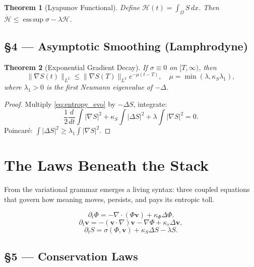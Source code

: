 \documentclass[11pt]{article}
\newtheorem{theorem}{Theorem}[section]
\theoremstyle{definition}
\theoremstyle{remark}
\newcommand{\vect}[1]{\bm{#1}}
\newcommand{\norm}[1]{\lVert #1\rVert}
\DeclareMathOperator{\esssup}{ess\,sup}
\begin{document}
\begin{theorem}[Lyapunov Functional]
Define $\mathcal{H}(t) = \int_\Omega S\,dx$. Then $\dot{\mathcal{H}} \le \esssup \sigma - \lambda \mathcal{H}$.
\end{theorem}

\subsection*{§4 — Asymptotic Smoothing (Lamphrodyne)}

\begin{theorem}[Exponential Gradient Decay]
If $\sigma \equiv 0$ on $[T,\infty)$, then
\[
\norm{\nabla S(t)}_{L^2} \le \norm{\nabla S(T)}_{L^2} e^{-\mu (t-T)}, \quad \mu = \min(\lambda, \kappa_S \lambda_1),
\]
where $\lambda_1 > 0$ is the first Neumann eigenvalue of $-\Delta$.
\end{theorem}

\begin{proof}
Multiply \eqref{eq:entropy_evo} by $-\Delta S$, integrate:
\[
\frac{1}{2} \frac{d}{dt} \int |\nabla S|^2 + \kappa_S \int |\Delta S|^2 + \lambda \int |\nabla S|^2 = 0.
\]
Poincaré: $\int |\Delta S|^2 \ge \lambda_1 \int |\nabla S|^2$.
\end{proof}

\section{The Laws Beneath the Stack}
From the variational grammar emerges a living syntax: three coupled equations that govern how meaning moves, persists, and pays its entropic toll.

\begin{equation}
\boxed{\partial_t \Phi = -\nabla\cdot(\Phi \vect{v}) + \kappa_\Phi \Delta \Phi.}
\label{eq:scalar_evo}
\end{equation}
\begin{equation}
\boxed{\partial_t \vect{v} = -(\vect{v}\cdot\nabla)\vect{v} - \nabla \Phi + \kappa_v \Delta \vect{v},}
\label{eq:vector_evo}
\end{equation}
\begin{equation}
\boxed{\partial_t S = \sigma(\Phi,\vect{v}) + \kappa_S \Delta S - \lambda S.}
\label{eq:entropy_evo}
\end{equation}

\subsection*{§5 — Conservation Laws}
\end{document}
